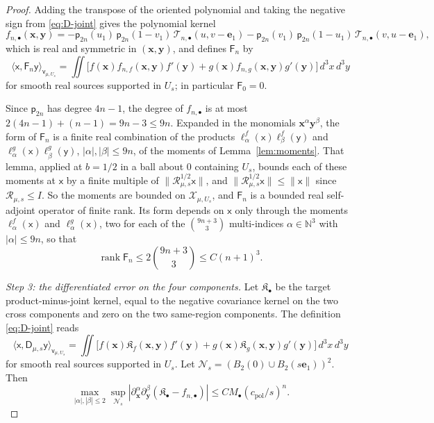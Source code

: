 \documentclass[11pt]{amsart}
\numberwithin{equation}{section}
\theoremstyle{definition}
\newcommand{\N}{\mathbb N}
\newcommand{\vv}{\mathsf v}
\newcommand{\JointRes}{\mathcal R}
\newcommand{\JointD}{\mathsf D}
\newcommand{\sx}{\mathsf x}
\newcommand{\sy}{\mathsf y}
\newcommand{\bx}{\mathbf x}
\newcommand{\by}{\mathbf y}
\newcommand{\eone}{\mathbf e_1}
\newcommand{\rank}{\operatorname{rank}}
\newcommand{\ip}[2]{\langle #1,#2\rangle}
\begin{document}
\begin{proof}
Adding the transpose of the oriented polynomial and taking the negative
sign from \eqref{eq:D-joint} gives the polynomial kernel
\[
 f_{n,\bullet}(\bx,\by)
 =-\mathsf p_{2n}(u_1)\,\mathsf p_{2n}(1-v_1)\,
   \mathcal T_{n,\bullet}(u,v-\eone)
  -\mathsf p_{2n}(v_1)\,\mathsf p_{2n}(1-u_1)\,
   \mathcal T_{n,\bullet}(v,u-\eone),
\]
which is real and symmetric in \((\bx,\by)\), and defines
\(\mathsf F_n\) by
\[
 \ip{\sx}{\mathsf F_n\sy}_{\vv_{\mu,U_s}}
 =\iint\bigl[f(\bx)f_{n,f}(\bx,\by)f'(\by)
 +g(\bx)f_{n,g}(\bx,\by)g'(\by)\bigr]\,d^3x\,d^3y
\]
for smooth real sources supported in \(U_s\); in particular
\(\mathsf F_0=0\).

Since \(\mathsf p_{2n}\) has degree \(4n-1\), the degree of
\(f_{n,\bullet}\) is at most \(2(4n-1)+(n-1)=9n-3\le9n\). Expanded in
the monomials \(\bx^\alpha\by^\beta\), the form of \(\mathsf F_n\) is a
finite real combination of the products
\(\ell^f_\alpha(\sx)\ell^f_\beta(\sy)\) and
\(\ell^g_\alpha(\sx)\ell^g_\beta(\sy)\), \(|\alpha|,|\beta|\le9n\), of
the moments of Lemma~\ref{lem:moments}. That lemma, applied at
\(b=1/2\) in a ball about \(0\) containing \(U_s\), bounds each of these
moments at \(\sx\) by a finite multiple of
\(\lVert\JointRes_{\mu,s}^{1/2}\sx\rVert\), and
\(\lVert\JointRes_{\mu,s}^{1/2}\sx\rVert\le\lVert\sx\rVert\) since
\(\JointRes_{\mu,s}\le I\). So the moments are bounded on
\(\mathcal X_{\mu,U_s}\), and \(\mathsf F_n\) is a bounded real
self-adjoint operator of finite rank. Its
form depends on \(\sx\) only through the moments \(\ell^f_\alpha(\sx)\)
and \(\ell^g_\alpha(\sx)\), two for each of the \(\binom{9n+3}{3}\)
multi-indices \(\alpha\in\N^3\) with \(|\alpha|\le9n\), so that
\[
 \rank\mathsf F_n\le2\binom{9n+3}{3}\le C(n+1)^3 .
\]

\smallskip
\emph{Step 3: the differentiated error on the four components.} Let
\(\mathfrak K_\bullet\) be the target product-minus-joint kernel, equal
to the negative covariance kernel on the two cross components and zero
on the two same-region components. The definition \eqref{eq:D-joint} reads
\[
 \ip{\sx}{\JointD_{\mu,s}\sy}_{\vv_{\mu,U_s}}
 =\iint\bigl[f(\bx)\mathfrak K_f(\bx,\by)f'(\by)
 +g(\bx)\mathfrak K_g(\bx,\by)g'(\by)\bigr]\,d^3x\,d^3y
\]
for smooth real sources supported in \(U_s\). Let
\(\mathcal N_s=(B_2(0)\cup B_2(s\eone))^2\).
Then
\begin{equation}
 \max_{|\alpha|,|\beta|\le2}
 \sup_{\mathcal N_s}
 \left|
 \partial_\bx^\alpha\partial_\by^\beta
 (\mathfrak K_\bullet-f_{n,\bullet})
 \right|
 \le CM_\bullet(c_{\mathrm{pol}}/s)^n.
 \label{eq:differentiated-error}
\end{equation}


\end{proof}
\end{document}
